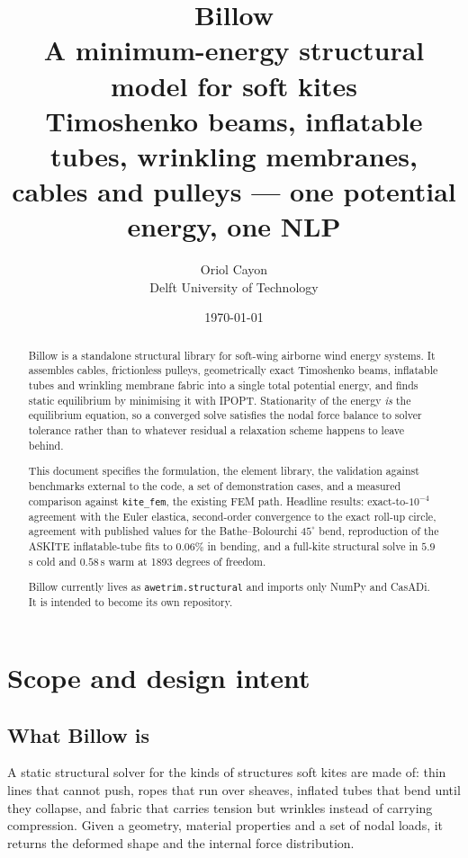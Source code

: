 \documentclass[11pt,a4paper]{article}
\title{%
  \vspace{-1.5cm}
  {\Huge\textbf{Billow}}\\[6pt]
  {\large A minimum-energy structural model for soft kites}\\[10pt]
  {\normalsize Timoshenko beams, inflatable tubes, wrinkling membranes,\\
   cables and pulleys --- one potential energy, one NLP}
}
\author{Oriol Cayon \\ \small Delft University of Technology}
\date{\today}
\newcommand{\code}[1]{\texttt{\small #1}}
\begin{document}
\maketitle
\thispagestyle{fancy}

\begin{abstract}
\noindent
Billow is a standalone structural library for soft-wing airborne wind energy
systems. It assembles cables, frictionless pulleys, geometrically exact
Timoshenko beams, inflatable tubes and wrinkling membrane fabric into a single
total potential energy, and finds static equilibrium by minimising it with
IPOPT. Stationarity of the energy \emph{is} the equilibrium equation, so a
converged solve satisfies the nodal force balance to solver tolerance rather
than to whatever residual a relaxation scheme happens to leave behind.

This document specifies the formulation, the element library, the validation
against benchmarks external to the code, a set of demonstration cases, and a
measured comparison against \code{kite\_fem}, the existing FEM path. Headline
results: exact-to-$10^{-4}$ agreement with the Euler elastica, second-order
convergence to the exact roll-up circle, agreement with published values for
the Bathe--Bolourchi $45^\circ$ bend, reproduction of the ASKITE inflatable-tube
fits to $0.06\%$ in bending, and a full-kite structural solve in $5.9$\,s cold
and $0.58$\,s warm at 1893 degrees of freedom.

Billow currently lives as \code{awetrim.structural} and imports only NumPy and
CasADi. It is intended to become its own repository.
\end{abstract}

\tableofcontents
\newpage

\section{Scope and design intent}

\subsection{What Billow is}

A static structural solver for the kinds of structures soft kites are made of:
thin lines that cannot push, ropes that run over sheaves, inflated tubes that
bend until they collapse, and fabric that carries tension but wrinkles instead
of carrying compression. Given a geometry, material properties and a set of
nodal loads, it returns the deformed shape and the internal force distribution.
\end{document}
